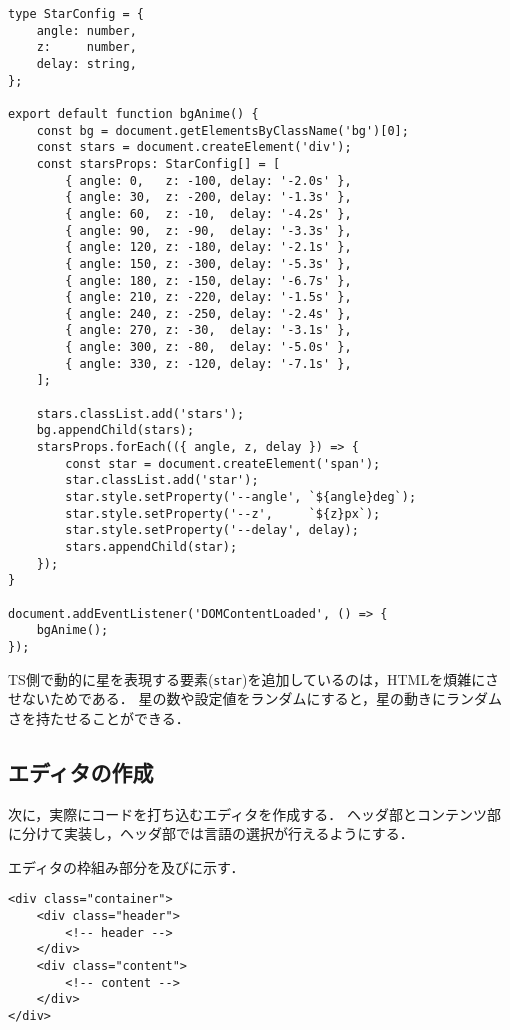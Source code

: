 \documentclass[autodetect-engine,dvi=dvipdfmx,ja=standard,
               a4j,11pt]{bxjsarticle}
\newcommand{\figref}[1]{\makebox{図~\ref{#1}}}
\begin{document}
\begin{lstlisting}[caption={\tt bgAnime.ts}, label={prog:bg-ts}]
type StarConfig = {
    angle: number,
    z:     number,
    delay: string,
};

export default function bgAnime() {
    const bg = document.getElementsByClassName('bg')[0];
    const stars = document.createElement('div');
    const starsProps: StarConfig[] = [
        { angle: 0,   z: -100, delay: '-2.0s' },
        { angle: 30,  z: -200, delay: '-1.3s' },
        { angle: 60,  z: -10,  delay: '-4.2s' },
        { angle: 90,  z: -90,  delay: '-3.3s' },
        { angle: 120, z: -180, delay: '-2.1s' },
        { angle: 150, z: -300, delay: '-5.3s' },
        { angle: 180, z: -150, delay: '-6.7s' },
        { angle: 210, z: -220, delay: '-1.5s' },
        { angle: 240, z: -250, delay: '-2.4s' },
        { angle: 270, z: -30,  delay: '-3.1s' },
        { angle: 300, z: -80,  delay: '-5.0s' },
        { angle: 330, z: -120, delay: '-7.1s' },
    ];

    stars.classList.add('stars');
    bg.appendChild(stars);
    starsProps.forEach(({ angle, z, delay }) => {
        const star = document.createElement('span');
        star.classList.add('star');
        star.style.setProperty('--angle', `${angle}deg`);
        star.style.setProperty('--z',     `${z}px`);
        star.style.setProperty('--delay', delay);
        stars.appendChild(star);
    });
}

document.addEventListener('DOMContentLoaded', () => {
    bgAnime();
});
\end{lstlisting}

TS側で動的に星を表現する要素(\verb|star|)を追加しているのは，HTMLを煩雑にさせないためである．
星の数や設定値をランダムにすると，星の動きにランダムさを持たせることができる．

\subsection{エディタの作成}

次に，実際にコードを打ち込むエディタを作成する．
ヘッダ部とコンテンツ部に分けて実装し，ヘッダ部では言語の選択が行えるようにする．

エディタの枠組み部分を\figref{prog:editor-base-html}及び\figref{prog:editor-base-scss}に示す．

\begin{lstlisting}[caption={\tt index.html(エディタ枠組み抜粋)}, label={prog:editor-base-html}]
<div class="container">
    <div class="header">
        <!-- header -->
    </div>
    <div class="content">
        <!-- content -->
    </div>
</div>
\end{lstlisting}
\end{document}
